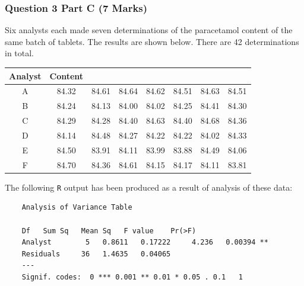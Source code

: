 \documentclass[a4paper,12pt]{article}
\begin{document}
\subsubsection*{Question 3 Part C (7 Marks)}
Six analysts each made seven determinations of the paracetamol content of the same batch of tablets.
The results are shown below. There are 42 determinations in total. 




\begin{center}
	\begin{tabular}{|c|ccccccc|}
		\hline
		Analyst	& Content		&		&		&		&		&		&		 \\ \hline
		A	&	84.32	&	84.61	&	84.64	&	84.62	&	84.51	&	84.63	&	84.51	 \\
		B	&	84.24	&	84.13	&	84.00	&	84.02	&	84.25	&	84.41	&	84.30	 \\
		C	&	84.29	&	84.28	&	84.40	&	84.63	&	84.40	&	84.68	&	84.36	 \\
		D	&	84.14	&	84.48	&	84.27	&	84.22	&	84.22	&	84.02	&	84.33	 \\
		E	&	84.50	&	83.91	&	84.11	&	83.99	&	83.88	&	84.49	&	84.06	 \\
		F	&	84.70	&	84.36	&	84.61	&	84.15	&	84.17	&	84.11	&	83.81	 \\
		\hline
	\end{tabular}
\end{center}
\bigskip
The following \texttt{R} output has been produced as a result of analysis of these data:

\begin{framed}
	\begin{verbatim}
	Analysis of Variance Table
	
	Df   Sum Sq   Mean Sq   F value    Pr(>F)
	Analyst        5   0.8611   0.17222     4.236   0.00394 **
	Residuals     36   1.4635   0.04065
	---
	Signif. codes:  0 *** 0.001 ** 0.01 * 0.05 . 0.1   1
	\end{verbatim}
\end{framed}
\end{document}
